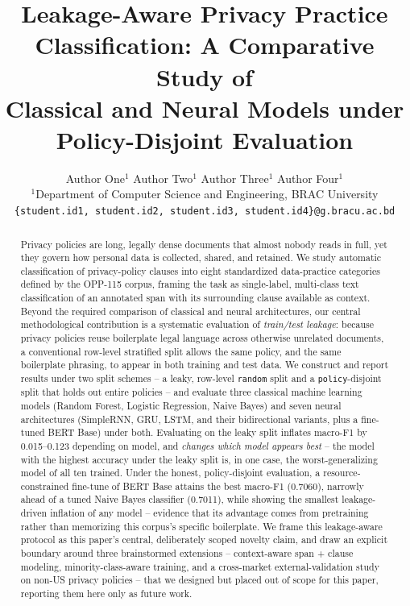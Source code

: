 \documentclass[11pt]{acl}
\title{Leakage-Aware Privacy Practice Classification: A Comparative Study of\\
Classical and Neural Models under Policy-Disjoint Evaluation}
\author{
Author One$^{1}$ \quad Author Two$^{1}$ \quad Author Three$^{1}$ \quad Author Four$^{1}$ \\
$^{1}$Department of Computer Science and Engineering, BRAC University \\
\texttt{\{student.id1, student.id2, student.id3, student.id4\}@g.bracu.ac.bd}
}
\begin{document}
\maketitle

\begin{abstract}
Privacy policies are long, legally dense documents that almost nobody reads in full,
yet they govern how personal data is collected, shared, and retained. We study
automatic classification of privacy-policy clauses into eight standardized data-practice
categories defined by the OPP-115 corpus, framing the task as single-label,
multi-class text classification of an annotated span with its surrounding clause
available as context. Beyond the required comparison of classical and neural
architectures, our central methodological contribution is a systematic evaluation of
\emph{train/test leakage}: because privacy policies reuse boilerplate legal language
across otherwise unrelated documents, a conventional row-level stratified split allows
the same policy, and the same boilerplate phrasing, to appear in both training and test
data. We construct and report results under two split schemes -- a leaky, row-level
\texttt{random} split and a \texttt{policy}-disjoint split that holds out entire policies
-- and evaluate three classical machine learning models (Random Forest, Logistic
Regression, Naive Bayes) and seven neural architectures (SimpleRNN, GRU, LSTM, and their
bidirectional variants, plus a fine-tuned BERT Base) under both. Evaluating on the leaky
split inflates macro-F1 by 0.015--0.123 depending on model, and \emph{changes which model
appears best} -- the model with the highest accuracy under the leaky split is, in one
case, the worst-generalizing model of all ten trained. Under the honest, policy-disjoint
evaluation, a resource-constrained fine-tune of BERT Base attains the best macro-F1
(0.7060), narrowly ahead of a tuned Naive Bayes classifier (0.7011), while showing the
smallest leakage-driven inflation of any model -- evidence that its advantage comes from
pretraining rather than memorizing this corpus's specific boilerplate. We frame this
leakage-aware protocol as this paper's central, deliberately scoped novelty claim, and
draw an explicit boundary around three brainstormed extensions -- context-aware span
+ clause modeling, minority-class-aware training, and a cross-market external-validation
study on non-US privacy policies -- that we designed but placed out of scope for this
paper, reporting them here only as future work.
\end{abstract}
\end{document}

